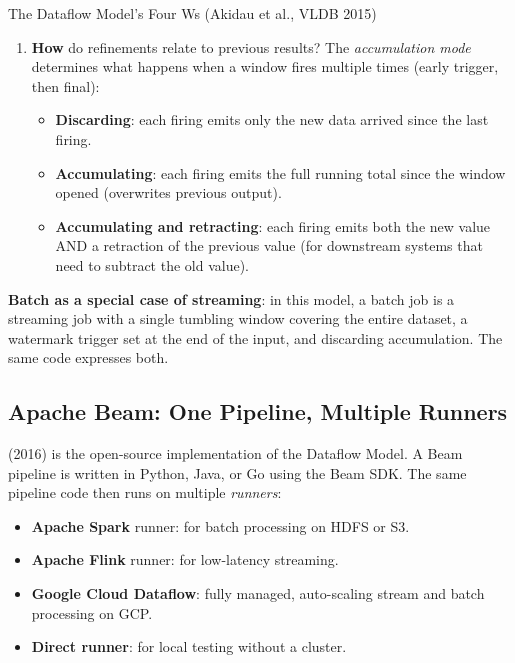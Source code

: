 \begin{defbox}{The Dataflow Model's Four Ws (Akidau et al., VLDB 2015)}
\begin{enumerate}
\begin{itemize}
                window's end time.
          \item \textbf{Periodic trigger}: emit every $n$ seconds
                regardless of the watermark.
          \item \textbf{Count trigger}: emit after $n$ events.
          \item \textbf{Composite}: e.g., emit early every 10 seconds
                AND emit a final result when the watermark passes.
        \end{itemize}
  \item \textbf{How} do refinements relate to previous results?
        The \emph{accumulation mode} determines what happens when a
        window fires multiple times (early trigger, then final):
        \begin{itemize}
          \item \textbf{Discarding}: each firing emits only the new data
                arrived since the last firing.
          \item \textbf{Accumulating}: each firing emits the full running
                total since the window opened (overwrites previous output).
          \item \textbf{Accumulating and retracting}: each firing emits
                both the new value AND a retraction of the previous value
                (for downstream systems that need to subtract the old value).
        \end{itemize}
\end{enumerate}
\textbf{Batch as a special case of streaming}: in this model, a batch
job is a streaming job with a single tumbling window covering the entire
dataset, a watermark trigger set at the end of the input, and discarding
accumulation. The same code expresses both.
\end{defbox}

\subsection{Apache Beam: One Pipeline, Multiple Runners}
\label{subsec:beam}

 (2016) is the open-source implementation of the
Dataflow Model. A Beam pipeline is written in Python, Java, or Go using
the Beam SDK. The same pipeline code then runs on multiple \emph{runners}:
\begin{itemize}
  \item \textbf{Apache Spark} runner: for batch processing on HDFS or S3.
  \item \textbf{Apache Flink} runner: for low-latency streaming.
  \item \textbf{Google Cloud Dataflow}: fully managed, auto-scaling stream
        and batch processing on GCP.
  \item \textbf{Direct runner}: for local testing without a cluster.
\end{itemize}

